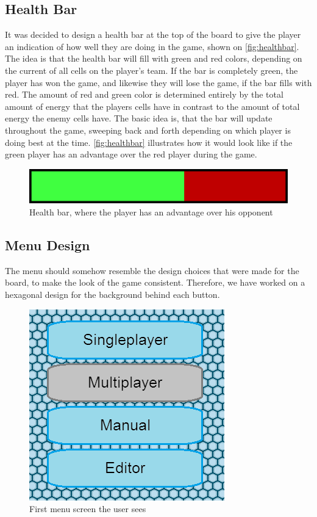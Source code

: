 \subsection{Health Bar}
It was decided to design a health bar at the top of the board to give the player an indication of how well they are doing in the game, shown on \autoref{fig:healthbar}.
The idea is that the health bar will fill with green and red colors, depending on the current of all cells on the player's team.
If the bar is completely green, the player has won the game, and likewise they will lose the game, if the bar fills with red.
The amount of red and green color is determined entirely by the total amount of energy that the players cells have in contrast to the amount of total energy the enemy cells have.
The basic idea is, that the bar will update throughout the game, sweeping back and forth depending on which player is doing best at the time.
\autoref{fig:healthbar} illustrates how it would look like if the green player has an advantage over the red player during the game.

\begin{figure}[ht]
	\centering
		\includegraphics{img/healthbar_example.png}
	\caption{Health bar, where the player has an advantage over his opponent}
	\label{fig:healthbar}
\end{figure}

\subsection{Menu Design}
The menu should somehow resemble the design choices that were made for the board, to make the look of the game consistent.
Therefore, we have worked on a hexagonal design for the background behind each button.\newline

\begin{figure}[ht]
	\centering
		\includegraphics{img/final_menu.png}
	\caption{First menu screen the user sees}
	\label{fig:menu1}
\end{figure}

